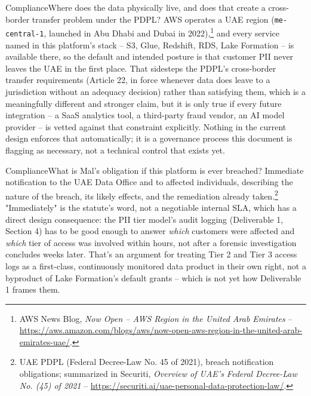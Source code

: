 \documentclass[11pt]{article}
\begin{document}
\begin{stakeholderq}{Compliance}{Where does the data physically live, and does that create a cross-border transfer problem under the PDPL?}
AWS operates a UAE region (\texttt{me-central-1}, launched in Abu Dhabi and Dubai in 2022),\footnote{AWS News Blog, \emph{Now Open -- AWS Region in the United Arab Emirates} -- \url{https://aws.amazon.com/blogs/aws/now-open-aws-region-in-the-united-arab-emirates-uae/}.} and every service named in this platform's stack -- S3, Glue, Redshift, RDS, Lake Formation -- is available there, so the default and intended posture is that customer PII never leaves the UAE in the first place. That sidesteps the PDPL's cross-border transfer requirements (Article 22, in force whenever data does leave to a jurisdiction without an adequacy decision) rather than satisfying them, which is a meaningfully different and stronger claim, but it is only true if every future integration -- a SaaS analytics tool, a third-party fraud vendor, an AI model provider -- is vetted against that constraint explicitly. Nothing in the current design enforces that automatically; it is a governance process this document is flagging as necessary, not a technical control that exists yet.
\end{stakeholderq}

\begin{stakeholderq}{Compliance}{What is Mal's obligation if this platform is ever breached?}
Immediate notification to the UAE Data Office and to affected individuals, describing the nature of the breach, its likely effects, and the remediation already taken.\footnote{UAE PDPL (Federal Decree-Law No. 45 of 2021), breach notification obligations; summarized in Securiti, \emph{Overview of UAE's Federal Decree-Law No. (45) of 2021} -- \url{https://securiti.ai/uae-personal-data-protection-law/}.} "Immediately" is the statute's word, not a negotiable internal SLA, which has a direct design consequence: the PII tier model's audit logging (Deliverable 1, Section 4) has to be good enough to answer \emph{which} customers were affected and \emph{which} tier of access was involved within hours, not after a forensic investigation concludes weeks later. That's an argument for treating Tier 2 and Tier 3 access logs as a first-class, continuously monitored data product in their own right, not a byproduct of Lake Formation's default grants -- which is not yet how Deliverable 1 frames them.
\end{stakeholderq}
\end{document}

